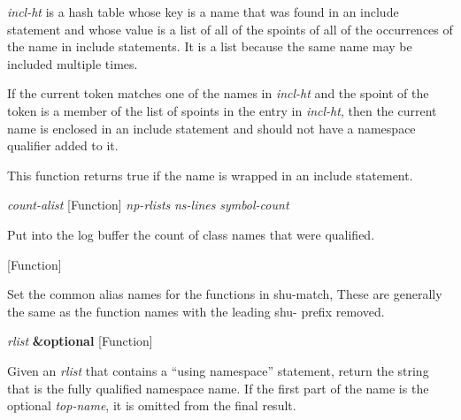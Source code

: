 \begin{doc-string}
\emph{incl-ht} is a hash table whose key is a name that was found in an include
statement and whose value is a list of all of the spoints of all of the
occurrences of the name in include statements.  It is a list because the same
name may be included multiple times.

If the current token matches one of the names in \emph{incl-ht} and the spoint of the
token is a member of the list of spoints in the entry in \emph{incl-ht}, then the
current name is enclosed in an include statement and should not have a namespace
qualifier added to it.

This function returns true if the name is wrapped in an include statement.
\end{doc-string}

\vspace{1em}
\noindent
{}
\usebox{\funcname}\emph{count-alist}
 \hfill [Function]
\hspace*{\wd\funcname}\emph{np-rlists} \emph{ns-lines}
\hspace*{\wd\funcname}\emph{symbol-count}
\hspace*{\wd\funcname}

\begin{doc-string}
Put into the log buffer the count of class names that were qualified.
\end{doc-string}

\vspace{1em}
\noindent
{}
\usebox{\funcname}
 \hfill [Function]

\begin{doc-string}
Set the common alias names for the functions in shu-match,
These are generally the same as the function names with the leading
shu- prefix removed.
\end{doc-string}

\vspace{1em}
\noindent
{}
\usebox{\funcname}\emph{rlist} \textbf{\&optional}
 \hfill [Function]
\hspace*{\wd\funcname}

\begin{doc-string}
Given an \emph{rlist} that contains a ``using namespace'' statement, return the string
that is the fully qualified namespace name.  If the first part of the name is the
optional \emph{top-name}, it is omitted from the final result.
\end{doc-string}


